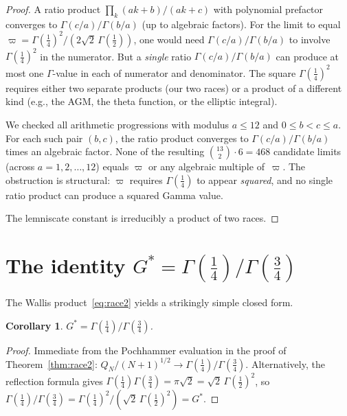 \documentclass[12pt,reqno]{amsart}
\newtheorem{corollary}[theorem]{Corollary}
\theoremstyle{definition}
\theoremstyle{remark}
\newcommand{\Gstar}{G^{\!*}}
\newcommand{\varpiup}{\varpi}
\begin{document}
\begin{proof}
A ratio product $\prod_{k}(ak+b)/(ak+c)$ with polynomial prefactor
converges to $\Gamma(c/a)/\Gamma(b/a)$ (up to algebraic factors).
For the limit to equal $\varpiup = \Gamma(\tfrac14)^{2}/(2\sqrt{2}\,
\Gamma(\tfrac12))$, one would need $\Gamma(c/a)/\Gamma(b/a)$ to involve
$\Gamma(\tfrac14)^{2}$ in the numerator.  But a \emph{single} ratio
$\Gamma(c/a)/\Gamma(b/a)$ can produce at most one $\Gamma$-value in each
of numerator and denominator.  The square $\Gamma(\tfrac14)^{2}$ requires
either two separate products (our two races) or a product of a different
kind (e.g., the AGM, the theta function, or the elliptic integral).

We checked all arithmetic progressions with modulus $a \le 12$ and
$0 \le b < c \le a$.  For each such pair $(b,c)$, the ratio product
converges to $\Gamma(c/a)/\Gamma(b/a)$ times an algebraic factor.
None of the resulting $\binom{13}{2} \cdot 6 = 468$ candidate limits
(across $a = 1, 2, \ldots, 12$) equals $\varpiup$ or any algebraic
multiple of~$\varpiup$.  The obstruction is structural: $\varpiup$
requires $\Gamma(\tfrac14)$ to appear \emph{squared}, and no single
ratio product can produce a squared Gamma value.

The lemniscate constant is irreducibly a product of two races.
\end{proof}


\section{The identity $\Gstar = \Gamma(\tfrac14)/\Gamma(\tfrac34)$}
\label{sec:identity}

The Wallis product~\eqref{eq:race2} yields a strikingly simple
closed form.

\begin{corollary}\label{cor:simplest}
$\Gstar = \Gamma(\tfrac14)/\Gamma(\tfrac34)$.
\end{corollary}

\begin{proof}
Immediate from the Pochhammer evaluation in the proof of
Theorem~\ref{thm:race2}: $Q_{N}/(N+1)^{1/2}\to
\Gamma(\tfrac14)/\Gamma(\tfrac34)$.  Alternatively, the reflection
formula gives
$\Gamma(\tfrac14)\Gamma(\tfrac34) = \pi\sqrt{2} = \sqrt{2}\,
\Gamma(\tfrac12)^{2}$, so
$\Gamma(\tfrac14)/\Gamma(\tfrac34)
= \Gamma(\tfrac14)^{2}/(\sqrt{2}\,\Gamma(\tfrac12)^{2}) = \Gstar$.
\end{proof}
\end{document}
